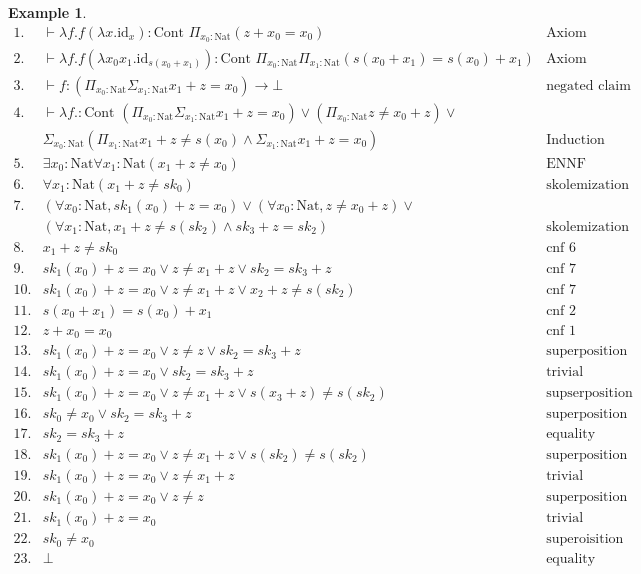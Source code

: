 \documentclass[onehalfspacing]{article}
\newtheorem{example}[theorem]{Example}
\begin{document}
\begin{example}\hfill
	\begin{align*}
		1. &\vdash \lambda f. f(\lambda x.\text{id}_{x}): \text{Cont }\Pi_{x_0 : \text{Nat}}(z + x_0 = x_0) & \text{Axiom}\\
		2.&\vdash \lambda f. f(\lambda x_0x_1.\text{id}_{s(x_0 + x_1)}): \text{Cont }\Pi_{x_0:\text{Nat}}\Pi_{x_1: \text{Nat}}(s(x_0 + x_1) = s(x_0) + x_1) & \text{Axiom}\\
		3.&\vdash f: (\Pi_{x_0 : \text{Nat}}\Sigma_{x_1:\text{Nat}}x_1 + z = x_0)\to\bot & \text{negated claim}\\
		4.&\vdash \lambda f.:\text{Cont }(\Pi_{x_0 : \text{Nat}}\Sigma_{x_1:\text{Nat}}x_1 + z = x_0)\vee(\Pi_{x_0 : \text{Nat}}z\neq x_0 + z)\vee&\\
		&\Sigma_{x_0:\text{Nat}}(\Pi_{x_1:\text{Nat}}x_1 + z\neq s(x_0)\wedge \Sigma_{x_1:\text{Nat}} x_1+z=x_0)&\text{Induction axiom (ENNF)}\\
		5.&\exists x_0: \text{Nat}\forall x_1: \text{Nat}(x_1 + z \neq x_0) & \text{ENNF transformation 3}\\
		6.&\forall x_1: \text{Nat}(x_1 + z \neq sk_0) & \text{skolemization 5}\\
		7.&(\forall x_0:\text{Nat}, sk_1(x_0) + z = x_0)\vee(\forall x_0:\text{Nat},z\neq x_0 + z)\vee&\\
		&(\forall x_1:\text{Nat}, x_1 + z\neq s(sk_2)\wedge sk_3+z=sk_2)&\text{skolemization 4}\\
		8.&x_1 + z\neq sk_0&\text{cnf 6}\\
		9.&sk_1(x_0) + z = x_0\vee z\neq x_1 + z\vee sk_2 = sk_3 + z&\text{cnf 7}\\
		10.&sk_1(x_0) + z = x_0\vee z\neq x_1 + z\vee x_2 + z\neq s(sk_2)&\text{cnf 7}\\
		11.&s(x_0 + x_1) = s(x_0) + x_1&\text{cnf 2}\\
		12.&z + x_0 = x_0&\text{cnf 1}\\
		13.&sk_1(x_0) + z = x_0\vee z\neq z\vee sk_2 = sk_3 + z&\text{superposition 9, 12}\\
		14.&sk_1(x_0) + z = x_0\vee sk_2 = sk_3 + z&\text{trivial inequality removal 13}\\
		15.&sk_1(x_0) + z = x_0\vee z\neq x_1 + z\vee s(x_3 + z)\neq s(sk_2)&\text{supserposition 10, 11}\\
		16.&sk_0\neq x_0\vee sk_2 = sk_3 + z&\text{superposition 8, 14}\\
		17.&sk_2 = sk_3 + z&\text{equality resolution 16}\\
		18.&sk_1(x_0) + z = x_0\vee z\neq x_1 + z\vee s(sk_2)\neq s(sk_2)&\text{superposition 15, 17}\\
		19.&sk_1(x_0) + z = x_0\vee z\neq x_1 + z&\text{trivial inequality removal 18}\\
		20.&sk_1(x_0) + z = x_0\vee z\neq z&\text{superposition 12, 19}\\
		21.&sk_1(x_0) + z = x_0&\text{trivial inequality removal 20}\\
		22.&sk_0 \neq x_0&\text{superoisition 21, 8}\\
		23.&\bot&\text{equality resolution 22}
	\end{align*}
\end{example}
\end{document}
